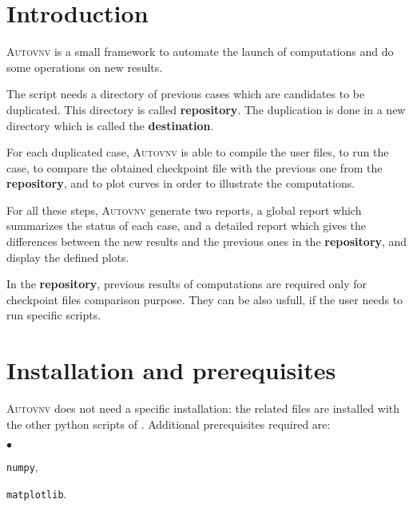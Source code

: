 \documentclass[a4paper,10pt,twoside]{article}
\begin{document}
\def\contentsname{\textbf{\normalsize TABLE OF CONTENTS}\pdfbookmark[1]{Table of
contents}{contents}}

\large
\makepdgCS
\normalsize

\passepage

\begin{center}\begin{singlespace}
\tableofcontents
\end{singlespace}\end{center}
%
\section{Introduction}

\textsc{Autovnv} is a small framework to automate the launch of \CS computations
and do some operations on new results.

The script needs a directory of previous \CS cases which are candidates to be
duplicated. This directory is called \textbf{repository}. The duplication is
done in a new directory which is called the \textbf{destination}.

For each duplicated case, \textsc{Autovnv} is able to compile the user files, to
run the case, to compare the obtained checkpoint file with the previous one from
the \textbf{repository}, and to plot curves in order to illustrate the
computations.

For all these steps, \textsc{Autovnv} generate two reports, a global report
which summarizes the status of each case, and a detailed report which gives the
differences between the new results and the previous ones in the
\textbf{repository}, and display the defined plots.

In the \textbf{repository}, previous results of computations are required only
for checkpoint files comparison purpose. They can be also usfull, if the user
needs to run specific scripts.

\section{Installation and prerequisites}

\textsc{Autovnv} does not need a specific installation: the related files are
installed with the other python scripts of \CS. Additional prerequisites
required are:
\begin{list}{$\bullet$}{}
\item \texttt{numpy},
\item \texttt{matplotlib}.
\end{list}
\end{document}
